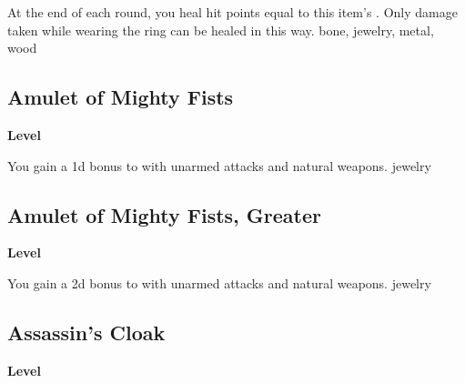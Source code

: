 \vspace{-1.5em}  %
At the end of each round, you heal hit points equal to this item's .
Only damage taken while wearing the ring can be healed in this way.
 
 bone, jewelry, metal, wood
\begin{multicols}{2}
\lowercase{\hypertarget{item:Amulet of Mighty Fists}{}}\label{item:Amulet of Mighty Fists}
\hypertarget{item:Amulet of Mighty Fists}{\subsection{Amulet of Mighty Fists}}
\columnbreak%
\begin{flushright}
\large\textbf{ Level}
\end{flushright}
\end{multicols}
\vspace{-1.5em}  %
You gain a \plus1d bonus to  with unarmed attacks and natural weapons.
 
 jewelry
\begin{multicols}{2}
\lowercase{\hypertarget{item:Amulet of Mighty Fists, Greater}{}}\label{item:Amulet of Mighty Fists, Greater}
\hypertarget{item:Amulet of Mighty Fists, Greater}{\subsection{Amulet of Mighty Fists, Greater}}
\columnbreak%
\begin{flushright}
\large\textbf{ Level}
\end{flushright}
\end{multicols}
\vspace{-1.5em}  %
You gain a \plus2d bonus to  with unarmed attacks and natural weapons.
 
 jewelry
\begin{multicols}{2}
\lowercase{\hypertarget{item:Assassin's Cloak}{}}\label{item:Assassin's Cloak}
\hypertarget{item:Assassin's Cloak}{\subsection{Assassin's Cloak}}
\columnbreak%
\begin{flushright}
\large\textbf{ Level}
\end{flushright}
\end{multicols}
